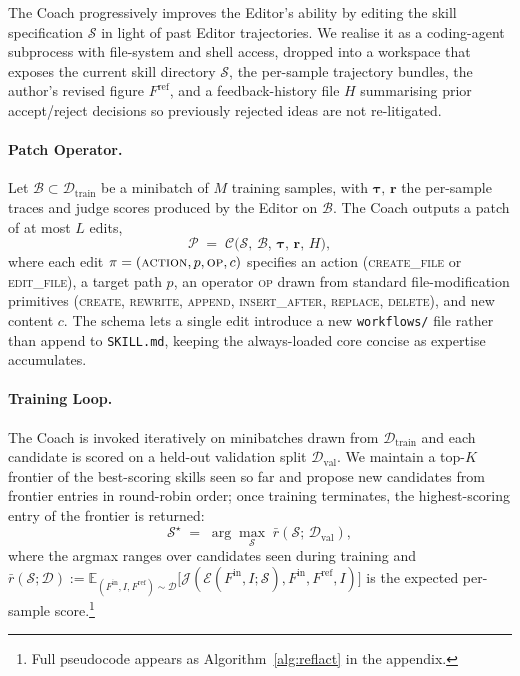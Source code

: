\documentclass[11pt]{article}
\begin{document}
The Coach progressively improves the Editor's ability by editing
the skill specification $\mathcal{S}$ in light of past Editor
trajectories.  We realise it as a coding-agent
subprocess with file-system and shell access, dropped into a
workspace that exposes the current skill directory $\mathcal{S}$,
the per-sample trajectory bundles, the author's revised figure
$F^{\mathrm{ref}}$, and a feedback-history file $H$ summarising
prior accept/reject decisions so previously rejected ideas are not
re-litigated.

\paragraph{Patch Operator.}
Let $\mathcal{B}\!\subset\!\mathcal{D}_{\mathrm{train}}$ be a
minibatch of $M$ training samples, with $\bm{\tau},\,\bm{r}$
the per-sample traces and judge scores produced by the Editor on
$\mathcal{B}$.  The Coach outputs a patch of at most $L$ edits,
\begin{equation}
\label{eq:patch}
\mathcal{P} \;=\; \mathcal{C}\bigl(\mathcal{S},\, \mathcal{B},\, \bm{\tau},\, \bm{r},\, H\bigr),
\end{equation}
where each edit
$\pi = (\textsc{action}, p, \textsc{op}, c)$ specifies an action
(\textsc{create\_file} or \textsc{edit\_file}), a target path $p$,
an operator \textsc{op} drawn from standard file-modification
primitives (\textsc{create}, \textsc{rewrite}, \textsc{append},
\textsc{insert\_after}, \textsc{replace}, \textsc{delete}), and
new content $c$.  The schema lets a single edit introduce a new
\texttt{workflows/} file rather than append to
\texttt{SKILL.md}, keeping the always-loaded core concise as
expertise accumulates.

\paragraph{Training Loop.}
\label{sec:trainloop}
The Coach is invoked iteratively on minibatches drawn from
$\mathcal{D}_{\mathrm{train}}$ and each candidate is scored on a
held-out validation split $\mathcal{D}_{\mathrm{val}}$.  We maintain a
top-$K$ frontier of the best-scoring skills seen so far and propose
new candidates from frontier entries in round-robin order; once training
terminates, the highest-scoring entry of the frontier is returned:
\begin{equation}
\label{eq:objective}
\mathcal{S}^{\star} \;=\; \arg\max_{\mathcal{S}}\; \bar{r}\!\left(\mathcal{S};\, \mathcal{D}_{\mathrm{val}}\right),
\end{equation}
where the argmax ranges over candidates seen during training and
$\bar{r}(\mathcal{S}; \mathcal{D}) :=
\mathbb{E}_{(F^{\mathrm{in}}, I, F^{\mathrm{ref}}) \sim \mathcal{D}}
\bigl[\mathcal{J}(\mathcal{E}(F^{\mathrm{in}}, I; \mathcal{S}),
F^{\mathrm{in}}, F^{\mathrm{ref}}, I)\bigr]$ is the expected
per-sample score.\footnote{Full pseudocode appears as
Algorithm~\ref{alg:reflact} in the appendix.}
\end{document}
